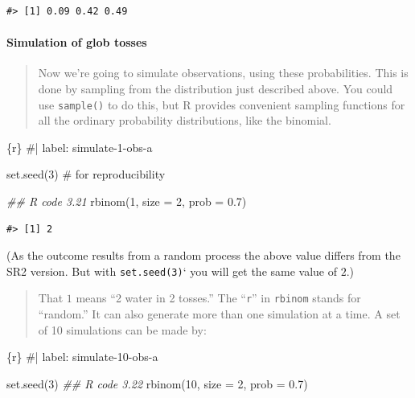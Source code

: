\documentclass[
  letterpaper,
  DIV=11,
  numbers=noendperiod]{scrreprt}
\let\oldparagraph\paragraph
\renewcommand{\paragraph}[1]{\oldparagraph{#1}\mbox{}}
\newenvironment{Shaded}{\begin{snugshade}}{\end{snugshade}}
\newcommand{\AttributeTok}[1]{\textcolor[rgb]{0.40,0.45,0.13}{#1}}
\newcommand{\CommentTok}[1]{\textcolor[rgb]{0.37,0.37,0.37}{#1}}
\newcommand{\DecValTok}[1]{\textcolor[rgb]{0.68,0.00,0.00}{#1}}
\newcommand{\DocumentationTok}[1]{\textcolor[rgb]{0.37,0.37,0.37}{\textit{#1}}}
\newcommand{\FloatTok}[1]{\textcolor[rgb]{0.68,0.00,0.00}{#1}}
\newcommand{\FunctionTok}[1]{\textcolor[rgb]{0.28,0.35,0.67}{#1}}
\newcommand{\InformationTok}[1]{\textcolor[rgb]{0.37,0.37,0.37}{#1}}
\newcommand{\NormalTok}[1]{\textcolor[rgb]{0.00,0.23,0.31}{#1}}
\begin{document}
\begin{verbatim}
#> [1] 0.09 0.42 0.49
\end{verbatim}

\hypertarget{simulation-of-glob-tosses}{%
\paragraph{Simulation of glob tosses}\label{simulation-of-glob-tosses}}

\begin{quote}
Now we're going to simulate observations, using these probabilities.
This is done by sampling from the distribution just described above. You
could use \texttt{sample()} to do this, but R provides convenient
sampling functions for all the ordinary probability distributions, like
the binomial.
\end{quote}

\begin{Shaded}
\begin{Highlighting}[]
\InformationTok{\textasciigrave{}\textasciigrave{}\textasciigrave{}\{r\}}
\CommentTok{\#| label: simulate{-}1{-}obs{-}a}

\FunctionTok{set.seed}\NormalTok{(}\DecValTok{3}\NormalTok{) }\CommentTok{\# for reproducibility}

\DocumentationTok{\#\# R code 3.21}
\FunctionTok{rbinom}\NormalTok{(}\DecValTok{1}\NormalTok{, }\AttributeTok{size =} \DecValTok{2}\NormalTok{, }\AttributeTok{prob =} \FloatTok{0.7}\NormalTok{)}
\InformationTok{\textasciigrave{}\textasciigrave{}\textasciigrave{}}
\end{Highlighting}
\end{Shaded}

\begin{verbatim}
#> [1] 2
\end{verbatim}

(As the outcome results from a random process the above value differs
from the SR2 version. But with \texttt{set.seed(3)}` you will get the
same value of \(2\).)

\begin{quote}
That \(1\) means ``2 water in 2 tosses.'' The ``\texttt{r}'' in
\texttt{rbinom} stands for ``random.'' It can also generate more than
one simulation at a time. A set of 10 simulations can be made by:
\end{quote}

\begin{Shaded}
\begin{Highlighting}[]
\InformationTok{\textasciigrave{}\textasciigrave{}\textasciigrave{}\{r\}}
\CommentTok{\#| label: simulate{-}10{-}obs{-}a}

\FunctionTok{set.seed}\NormalTok{(}\DecValTok{3}\NormalTok{)}
\DocumentationTok{\#\# R code 3.22}
\FunctionTok{rbinom}\NormalTok{(}\DecValTok{10}\NormalTok{, }\AttributeTok{size =} \DecValTok{2}\NormalTok{, }\AttributeTok{prob =} \FloatTok{0.7}\NormalTok{)}
\InformationTok{\textasciigrave{}\textasciigrave{}\textasciigrave{}}
\end{Highlighting}
\end{Shaded}
\end{document}
